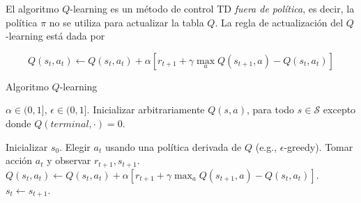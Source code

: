 
El algoritmo $Q$-learning \cite{watkins1992q} es un método de control TD \textit{fuera de política}, es decir,
la política $\pi$ no se utiliza para actualizar la tabla $Q$. 
La regla de actualización del $Q$-learning está dada por 

\[
Q(s_t, a_t) \leftarrow Q(s_t, a_t) + \alpha[r_{t+1} + \gamma \max_a Q(s_{t+1}, a) - Q(s_t, a_t)]
\]

\begin{algorithm}[H]
  	\caption{Algoritmo $Q$-learning}
	\label{alg:q-algo}
  \begin{algorithmic}[1]
  \REQUIRE $\alpha \in (0,1]$, $\epsilon \in (0, 1]$.
  \STATE Inicializar arbitrariamente $Q(s,a)$, para todo $s\in \mathcal{S}$ excepto donde $Q(terminal, \cdot) = 0$.
  
    \STATE Inicializar $s_0$.
    \STATE Elegir $a_t$ usando una política derivada de $Q$ (e.g., $\epsilon$-greedy).
    \STATE Tomar acción $a_t$ y observar $r_{t+1}, s_{t+1}$.
    \STATE $Q(s_t, a_t) \leftarrow Q(s_t, a_t) + \alpha [r_{t+1} + \gamma \max_a Q(s_{t+1}, a) - Q(s_t, a_t)]$.
    \STATE $s_t \leftarrow s_{t+1}$.
    \ENDFOR
  \ENDFOR
  \end{algorithmic}
\end{algorithm}

	
	
	
	

